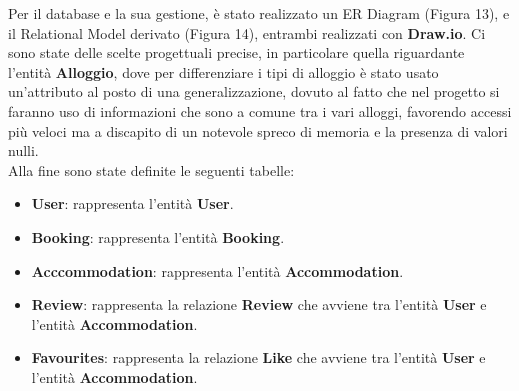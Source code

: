 \documentclass[10pt]{article}
\begin{document}
Per il database e la sua gestione, è stato realizzato un ER Diagram (Figura 13), e il Relational Model derivato (Figura 14), entrambi realizzati con \textbf{Draw.io}. Ci sono state delle scelte progettuali precise, in particolare quella riguardante l'entità \textbf{Alloggio}, dove per differenziare i tipi di alloggio è stato usato un'attributo al posto di una generalizzazione, dovuto al fatto che nel progetto si faranno uso di informazioni che sono a comune tra i vari alloggi, favorendo accessi più veloci ma a discapito di un notevole spreco di memoria e la presenza di valori nulli.\\
Alla fine sono state definite le seguenti tabelle:
\begin{itemize}
\item \textbf{User}: rappresenta l'entità \textbf{User}.
\item \textbf{Booking}: rappresenta l'entità \textbf{Booking}.
\item \textbf{Acccommodation}: rappresenta l'entità \textbf{Accommodation}.
\item \textbf{Review}: rappresenta la relazione \textbf{Review} che avviene tra l'entità \textbf{User} e l'entità \textbf{Accommodation}.
\item \textbf{Favourites}: rappresenta la relazione \textbf{Like} che avviene tra l'entità \textbf{User} e l'entità \textbf{Accommodation}.
\end{itemize}
\end{document}
